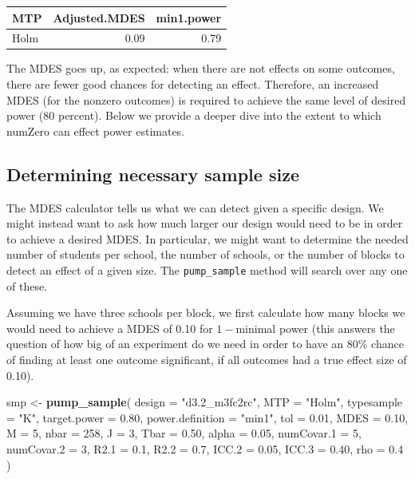 \documentclass[
]{article}
\newenvironment{Shaded}{\begin{snugshade}}{\end{snugshade}}
\newcommand{\DataTypeTok}[1]{\textcolor[rgb]{0.13,0.29,0.53}{#1}}
\newcommand{\DecValTok}[1]{\textcolor[rgb]{0.00,0.00,0.81}{#1}}
\newcommand{\FloatTok}[1]{\textcolor[rgb]{0.00,0.00,0.81}{#1}}
\newcommand{\KeywordTok}[1]{\textcolor[rgb]{0.13,0.29,0.53}{\textbf{#1}}}
\newcommand{\NormalTok}[1]{#1}
\newcommand{\StringTok}[1]{\textcolor[rgb]{0.31,0.60,0.02}{#1}}
\begin{document}
\begin{tabular}{l|r|r}
\hline
MTP & Adjusted.MDES & min1.power\\
\hline
Holm & 0.09 & 0.79\\
\hline
\end{tabular}

The MDES goes up, as expected: when there are not effects on some
outcomes, there are fewer good chances for detecting an effect.
Therefore, an increased MDES (for the nonzero outcomes) is required to
achieve the same level of desired power (80 percent). Below we provide a
deeper dive into the extent to which numZero can effect power estimates.

\subsection{Determining necessary sample size}

The MDES calculator tells us what we can detect given a specific design.
We might instead want to ask how much larger our design would need to be
in order to achieve a desired MDES. In particular, we might want to
determine the needed number of students per school, the number of
schools, or the number of blocks to detect an effect of a given size.
The \texttt{pump\_sample} method will search over any one of these.

Assuming we have three schools per block, we first calculate how many
blocks we would need to achieve a MDES of 0.10 for \(1-\)minimal power
(this answers the question of how big of an experiment do we need in
order to have an 80\% chance of finding at least one outcome
significant, if all outcomes had a true effect size of 0.10).

\begin{Shaded}
\begin{Highlighting}[]
\NormalTok{smp \textless{}{-}}\StringTok{ }\KeywordTok{pump\_sample}\NormalTok{(}
  \DataTypeTok{design =} \StringTok{"d3.2\_m3fc2rc"}\NormalTok{,}
  \DataTypeTok{MTP =} \StringTok{"Holm"}\NormalTok{,}
  \DataTypeTok{typesample =} \StringTok{"K"}\NormalTok{,}
  \DataTypeTok{target.power =} \FloatTok{0.80}\NormalTok{, }\DataTypeTok{power.definition =} \StringTok{"min1"}\NormalTok{, }\DataTypeTok{tol =} \FloatTok{0.01}\NormalTok{,}
  \DataTypeTok{MDES =} \FloatTok{0.10}\NormalTok{, }\DataTypeTok{M =} \DecValTok{5}\NormalTok{, }\DataTypeTok{nbar =} \DecValTok{258}\NormalTok{, }\DataTypeTok{J =} \DecValTok{3}\NormalTok{,}
  \DataTypeTok{Tbar =} \FloatTok{0.50}\NormalTok{, }\DataTypeTok{alpha =} \FloatTok{0.05}\NormalTok{, }\DataTypeTok{numCovar.1 =} \DecValTok{5}\NormalTok{, }\DataTypeTok{numCovar.2 =} \DecValTok{3}\NormalTok{,}
  \DataTypeTok{R2.1 =} \FloatTok{0.1}\NormalTok{, }\DataTypeTok{R2.2 =} \FloatTok{0.7}\NormalTok{, }\DataTypeTok{ICC.2 =} \FloatTok{0.05}\NormalTok{, }\DataTypeTok{ICC.3 =} \FloatTok{0.40}\NormalTok{, }\DataTypeTok{rho =} \FloatTok{0.4}\NormalTok{ )}
\end{Highlighting}
\end{Shaded}
\end{document}
